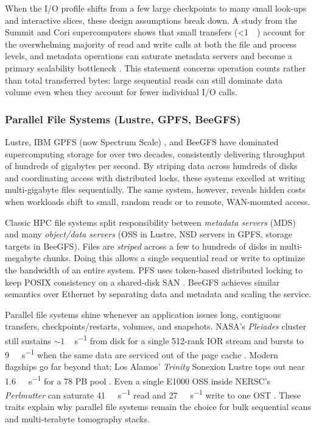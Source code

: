 \documentclass[nomenclature, english, bibtex]{kththesis}
\numberwithin{listing}{chapter}
\begin{document}
When the I/O profile shifts from a few large checkpoints to many small look-ups and interactive slices, these design assumptions break down. A study from the Summit and Cori supercomputers shows that small transfers (<\SI{1}{\mega\byte}) account for the overwhelming majority of read and write calls at both the file and process levels, and metadata operations can saturate metadata servers and become a primary scalability bottleneck \cite{bez2022access}. This statement concerns operation counts rather than total transferred bytes: large sequential reads can still dominate data volume even when they account for fewer individual I/O calls.

\subsubsection{\texorpdfstring{Parallel File Systems (Lustre, \gls{GPFS}, \gls{BeeGFS})}{Parallel File Systems (Lustre, GPFS, BeeGFS)}}
\label{sec:parallel-file-systems}
Lustre, IBM \gls{GPFS} (now Spectrum Scale) \cite{schmuck2002gpfs}, and \gls{BeeGFS} have dominated supercomputing storage for over two decades, consistently delivering throughput of hundreds of gigabytes per second. By striping data across hundreds of disks and coordinating access with distributed locks, these systems excelled at writing multi-gigabyte files sequentially. The same system, however, reveals hidden costs when workloads shift to small, random reads or to remote, \gls{WAN}-mounted access.

Classic \gls{HPC} file systems split responsibility between \emph{metadata servers} (\gls{MDS}) and many \emph{object/data servers} (\gls{OSS} in Lustre, \gls{NSD} servers in \gls{GPFS}, storage targets in \gls{BeeGFS}). Files are \emph{striped} across a few to hundreds of disks in multi-megabyte chunks. Doing this allows a single sequential read or write to optimize the bandwidth of an entire system. \gls{PFS} uses token-based distributed locking to keep \gls{POSIX} consistency on a shared-disk \gls{SAN} \cite{schmuck2002gpfs}. \gls{BeeGFS} achieves similar semantics over Ethernet by separating data and metadata and scaling the service.

Parallel file systems shine whenever an application issues long, contiguous transfers, checkpoints/restarts, volumes, and snapshots. NASA’s \emph{Pleiades} cluster still sustains \(\sim\!1\)\,\si{\giga\byte\per\second} from disk for a single 512-rank IOR stream and bursts to \SI{9}{\giga\byte\per\second} when the same data are serviced out of the page cache \cite{6507507}. Modern flagships go far beyond that; Los Alamos’ \emph{Trinity} Sonexion Lustre tops out near \SI{1.6}{\tera\byte\per\second} for a 78 PB pool \cite{osti_1367056}. Even a single E1000 \gls{OSS} inside NERSC’s \emph{Perlmutter} can saturate \SI{41}{\giga\byte\per\second} read and \SI{27}{\giga\byte\per\second} write to one \gls{OST} \cite{lockwood2024architecture}. These traits explain why parallel file systems remain the choice for bulk sequential scans and multi‐terabyte tomography stacks.
\end{document}
